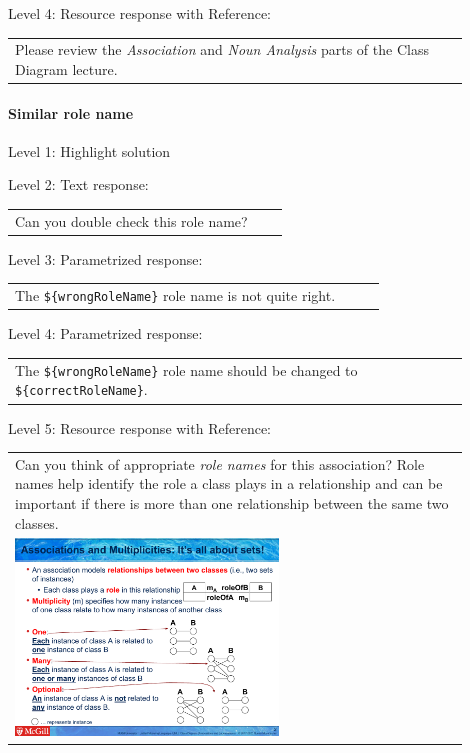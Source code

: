 \noindent Level 4: Resource response with Reference: \medskip

\begin{tabular}{|p{0.9\linewidth}}
Please review the \textit{Association} and \textit{Noun Analysis} parts of the Class Diagram lecture.
\end{tabular} \medskip


\paragraph{Similar role name}

\noindent Level 1: Highlight solution \medskip

\noindent Level 2: Text response: \medskip

\begin{tabular}{|p{0.9\linewidth}}
Can you double check this role name?
\end{tabular} \medskip

\noindent Level 3: Parametrized response: \medskip

\begin{tabular}{|p{0.9\linewidth}}
The \verb|${wrongRoleName}| role name is not quite right.
\end{tabular} \medskip

\noindent Level 4: Parametrized response: \medskip

\begin{tabular}{|p{0.9\linewidth}}
The \verb|${wrongRoleName}| role name should be changed to \verb|${correctRoleName}|.
\end{tabular} \medskip

\noindent Level 5: Resource response with Reference: \medskip

\begin{tabular}{|p{0.9\linewidth}}
Can you think of appropriate \textit{role names}
for this association? Role names help identify the role a class plays in a
relationship and can be important if there is more than one relationship
between the same two classes.

\\
\includegraphics[width=0.6\textwidth]{images/role_name.png}

\end{tabular} \medskip


